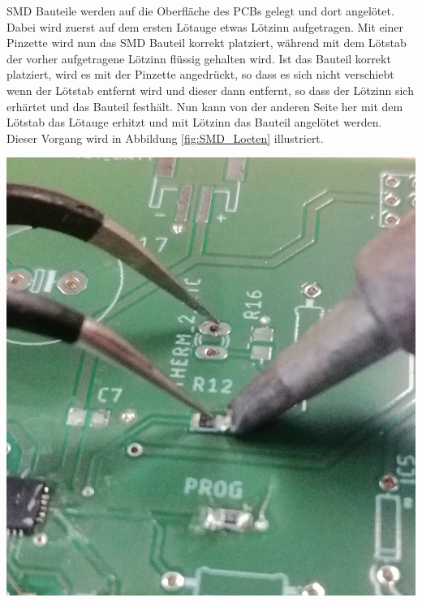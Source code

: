 {\begin{minipage}[b][8cm][t]{0.5\textwidth}
SMD Bauteile werden auf die Oberfläche des PCBs gelegt und dort angelötet. Dabei wird zuerst auf dem ersten Lötauge etwas Lötzinn aufgetragen. Mit einer Pinzette wird nun das SMD Bauteil korrekt platziert, während mit dem Lötstab der vorher aufgetragene Lötzinn flüssig gehalten wird. Ist das Bauteil korrekt platziert, wird es mit der Pinzette angedrückt, so dass es sich nicht verschiebt wenn der Lötstab entfernt wird und dieser dann entfernt, so dass der Lötzinn sich erhärtet und das Bauteil festhält. Nun kann von der anderen Seite her mit dem Lötstab das Lötauge erhitzt und mit Lötzinn das Bauteil angelötet werden. Dieser Vorgang wird in Abbildung \ref{fig:SMD_Loeten} illustriert.
\end{minipage}}
{\begin{minipage}[b][8cm][t]{0.49\textwidth}
\centering
\includegraphics[width=0.8\linewidth]{graphics/HW_Val/SMD_Loeten.jpg}
\label{fig:SMD_Loeten}
\end{minipage}}


